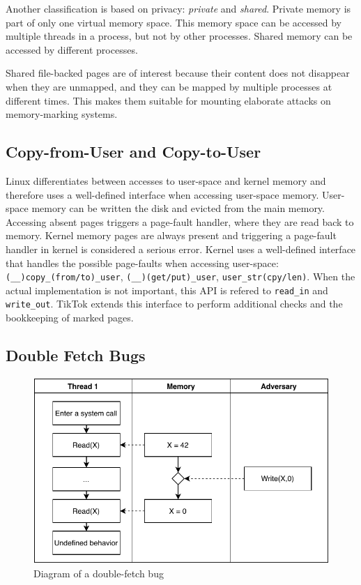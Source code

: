 \documentclass[conference]{IEEEtran}
\newcommand{\sysname}{TikTok}
\begin{document}
Another classification is based on privacy: \emph{private} and \emph{shared}.
Private memory is part of only one virtual memory space. This memory space can
be accessed by multiple threads in a process, but not by other processes. Shared
memory can be accessed by different processes.

Shared file-backed pages are of interest because their content does not
disappear when they are unmapped, and they can be mapped by multiple
processes at different times. This makes them suitable for mounting elaborate
attacks on memory-marking systems.

\subsection{Copy-from-User and Copy-to-User}
\label{subsec:copy}
Linux differentiates between accesses to user-space and kernel memory and
therefore uses a well-defined interface when accessing user-space memory.
User-space memory can be written the disk and evicted from the main memory.
Accessing absent pages triggers a page-fault handler, where they are read back
to memory. Kernel memory pages are always present and triggering a page-fault
handler in kernel is considered a serious error. Kernel uses a well-defined
interface that handles the possible page-faults when accessing user-space:
\texttt{(\_\_)copy\_(from/to)\_user}, \texttt{(\_\_)(get/put)\_user},
\texttt{user\_str(cpy/len)}. When the actual implementation is not important,
this API is refered to \texttt{read\_in} and \texttt{write\_out}. \sysname{}
extends this interface to perform additional checks and the bookkeeping of
marked pages.

\subsection{Double Fetch Bugs}
\label{subsec:doublefetch}

\begin{figure}[]
  \centering
  \includegraphics[width=.85\linewidth]{img/doublefetch.pdf}
  \caption{Diagram of a double-fetch bug}
  \label{fig:doublefetch}
\end{figure}
\end{document}
